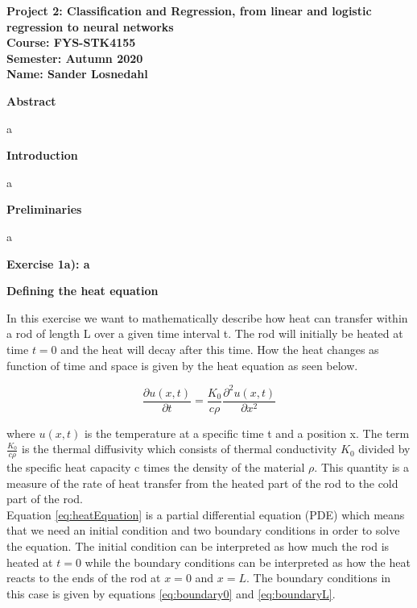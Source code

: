 \documentclass[12pt,a4paper]{article}
\begin{document}
\begin{center}
\LARGE{\textbf{Project 2: Classification and Regression, from linear and logistic regression to neural networks}}
\\
\large{\textbf{Course: FYS-STK4155}}
\\
\large{\textbf{Semester: Autumn 2020}}
\\
\large{\textbf{Name: Sander Losnedahl}}
\end{center}

\begin{center}
\Large{\textbf{Abstract}}
\end{center}

\noindent a

\newpage

\begin{center}
\Large{\textbf{Introduction}}
\end{center}

\noindent a

\newpage

\begin{center}
\Large{\textbf{Preliminaries}}
\end{center}

\noindent a

\newpage

\begin{center}
\Large{\textbf{Exercise 1a): a}}
\end{center}

\begin{center}
\large{\textbf{Defining the heat equation}}
\end{center}

\noindent In this exercise we want to mathematically describe how heat can transfer within a rod of length L over a given time interval t. The rod will initially be heated at time $t = 0$ and the heat will decay after this time. How the heat changes as function of time and space is given by the heat equation as seen below.

\begin{equation}\label{eq:heatEquation}
\frac{\partial u(x,t)}{\partial t} = \frac{K_0}{c\rho} \frac{\partial^2 u(x,t)}{\partial x^2} 
\end{equation}

\noindent where $u(x,t)$ is the temperature at a specific time t and a position x. The term $\frac{K_0}{c\rho}$ is the thermal diffusivity which consists of thermal conductivity $K_0$ divided by the specific heat capacity c times the density of the material $\rho$. This quantity is a measure of the rate of heat transfer from the heated part of the rod to the cold part of the rod. 
\\
Equation \ref{eq:heatEquation} is a partial differential equation (PDE) which means that we need an initial condition and two boundary conditions in order to solve the equation. The initial condition can be interpreted as how much the rod is heated at $t = 0$ while the boundary conditions can be interpreted as how the heat reacts to the ends of the rod at $x = 0$ and $x = L$. The boundary conditions in this case is given by equations \ref{eq:boundary0} and \ref{eq:boundaryL}.
\end{document}
